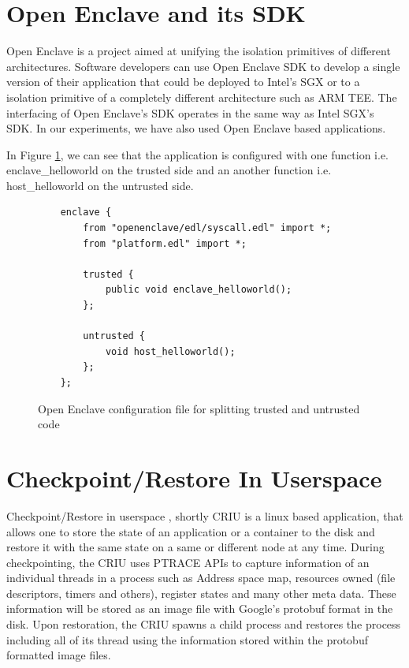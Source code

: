 \documentclass[article, doublespace,nopageskip]{VTthesis} %
\begin{document}
    \section{Open Enclave and its SDK} \label{ss:Openenclave SGX SDK}
    Open Enclave is a project aimed at unifying the isolation primitives of different architectures. Software developers can use Open Enclave SDK \cite{Open-Enclave} to develop a single version of their application that could be deployed to Intel's SGX or to a isolation primitive of a completely different architecture such as ARM TEE. The interfacing of Open Enclave's SDK operates in the same way as Intel SGX's SDK. In our experiments, we have also used Open Enclave based applications.

    In Figure \ref{fig:OE config}, we can see that the application is configured with one function i.e. enclave\_helloworld on the trusted side and an another function i.e. host\_helloworld on the untrusted side. 

    \begin{figure}
    \begin{tcolorbox}
    \begin{verbatim}
    enclave {
        from "openenclave/edl/syscall.edl" import *;
        from "platform.edl" import *;

        trusted {
            public void enclave_helloworld();
        };

        untrusted {
            void host_helloworld();
        };
    };
    \end{verbatim}
    \end{tcolorbox}
    \caption{Open Enclave configuration file for splitting trusted and untrusted code}
    \label{fig:OE config}
    \end{figure}

    \section{Checkpoint/Restore In Userspace} \label{ss:CRIU}
    Checkpoint/Restore in userspace \cite{CRIU}, shortly CRIU is a linux based application, that allows one to store the state of an application or a container to the disk and restore it with the same state on a same or different node at any time. During checkpointing, the CRIU uses PTRACE APIs to capture information of an individual threads in a process such as Address space map, resources owned (file descriptors, timers and others), register states and many other meta data. These information will be stored as an image file with Google's protobuf \cite{Protobuf} format in the disk. Upon restoration, the CRIU spawns a child process and restores the process including all of its thread using the information stored within the protobuf formatted image files. 
\end{document}
